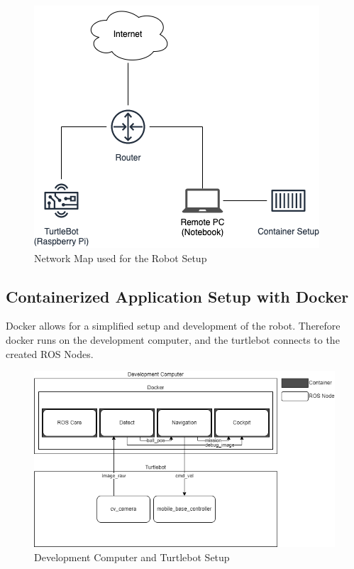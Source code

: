 \begin{figure}[!htb]
\centering
\includegraphics[width=\linewidth]{images/turtlebot-setup/network_setup.png}
\caption{Network Map used for the Robot Setup}
\label{fig:network-setup}
\end{figure}

\subsection{Containerized Application Setup with Docker}
\label{sec:container-setup}
Docker allows for a simplified setup and development of the robot. Therefore docker runs on the development computer, and the turtlebot connects to the created ROS Nodes.

\begin{figure}[!ht]
\centering
\includegraphics[width=\linewidth]{images/turtlebot-setup/docker-setup.png}
\caption{Development Computer and Turtlebot Setup}
\label{fig:dev-pc-turtlebot}
\end{figure}

